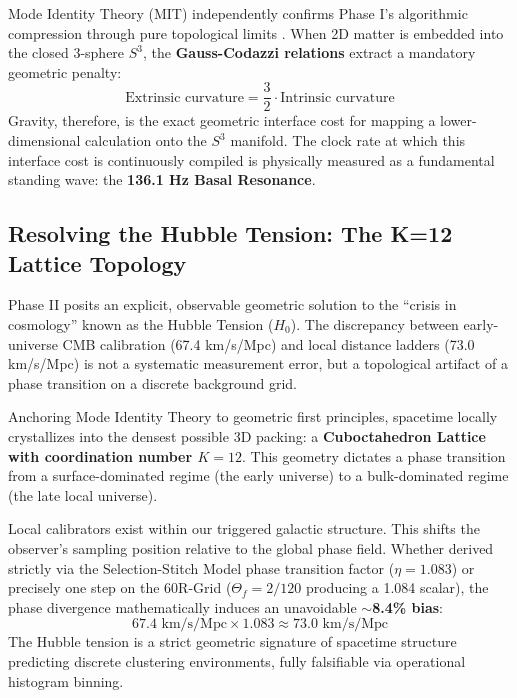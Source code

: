\documentclass[12pt, a4paper]{article}
\theoremstyle{plain}
\theoremstyle{definition}
\begin{document}
Mode Identity Theory (MIT) independently confirms Phase I's algorithmic compression through pure topological limits \citep{MIT2025}. When 2D matter is embedded into the closed 3-sphere $S^3$, the \textbf{Gauss-Codazzi relations} extract a mandatory geometric penalty:
\begin{equation}
\text{Extrinsic curvature} = \frac{3}{2} \cdot \text{Intrinsic curvature}
\end{equation}
Gravity, therefore, is the exact geometric interface cost for mapping a lower-dimensional calculation onto the $S^3$ manifold. The clock rate at which this interface cost is continuously compiled is physically measured as a fundamental standing wave: the \textbf{136.1 Hz Basal Resonance}.

\subsection{Resolving the Hubble Tension: The K=12 Lattice Topology}

Phase II posits an explicit, observable geometric solution to the ``crisis in cosmology'' known as the Hubble Tension ($H_0$). The discrepancy between early-universe CMB calibration (67.4 km/s/Mpc) and local distance ladders (73.0 km/s/Mpc) is not a systematic measurement error, but a topological artifact of a phase transition on a discrete background grid.

Anchoring Mode Identity Theory to geometric first principles, spacetime locally crystallizes into the densest possible 3D packing: a \textbf{Cuboctahedron Lattice with coordination number $K=12$}. This geometry dictates a phase transition from a surface-dominated regime (the early universe) to a bulk-dominated regime (the late local universe). 

Local calibrators exist within our triggered galactic structure. This shifts the observer's sampling position relative to the global phase field. Whether derived strictly via the Selection-Stitch Model phase transition factor ($\eta = 1.083$) or precisely one step on the 60R-Grid ($\Theta_f = 2/120$ producing a 1.084 scalar), the phase divergence mathematically induces an unavoidable \textbf{$\sim$8.4\% bias}:
\begin{equation}
67.4 \text{ km/s/Mpc} \times 1.083 \approx 73.0 \text{ km/s/Mpc}
\end{equation}
The Hubble tension is a strict geometric signature of spacetime structure predicting discrete clustering environments, fully falsifiable via operational histogram binning.
\end{document}
